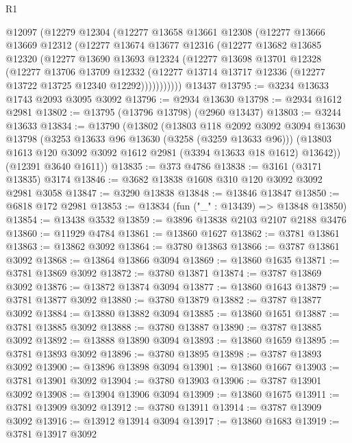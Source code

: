 \begin{lexlean}{R1}
\begin{coremodule}
    @12097
      (@12279
        @12304
        (@12277
          @13658
          @13661
          @12308
          (@12277
            @13666
            @13669
            @12312
            (@12277
              @13674
              @13677
              @12316
              (@12277
                @13682
                @13685
                @12320
                (@12277
                  @13690
                  @13693
                  @12324
                  (@12277
                    @13698
                    @13701
                    @12328
                    (@12277
                      @13706
                      @13709
                      @12332
                      (@12277 @13714 @13717 @12336 (@12277 @13722 @13725 @12340 @12292)))))))))))
    @13437
@13795 := @3234 @13633 @1743 @2093 @3095 @3092
@13796 := @2934 @13630
@13798 := @2934 @1612 @2981
@13802 := @13795 (@13796 @13798) (@2960 @13437)
@13803 := @3244 @13633
@13834 := @13790
    (@13802
      (@13803
        @118
        @2092
        @3092
        @3094
        @13630
        @13798
        (@3253 @13633 @96 @13630 (@3258 (@3259 @13633 @96)))
        (@13803 @1613 @120 @3092 @3092 @1612 @2981 (@3394 @13633 @18 @1612) @13642))
      (@12391 @3640 @1611))
@13835 := @373 @4786
@13838 := @3161 (@3171 @13835) @3174
@13846 := @3682 @13838 @1608 @310 @120 @3092 @3092 @2981 @3058
@13847 := @3290 @13838
@13848 := @13846 @13847
@13850 := @6818 @172 @2981
@13853 := @13834 (fun ("_" : @13439) => @13848 @13850)
@13854 := @13438 @3532
@13859 := @3896 @13838 @2103 @2107 @2188 @3476
@13860 := @11929 @4784
@13861 := @13860 @1627
@13862 := @3781 @13861
@13863 := @13862 @3092
@13864 := @3780 @13863
@13866 := @3787 @13861 @3092
@13868 := @13864 @13866 @3094
@13869 := @13860 @1635
@13871 := @3781 @13869 @3092
@13872 := @3780 @13871
@13874 := @3787 @13869 @3092
@13876 := @13872 @13874 @3094
@13877 := @13860 @1643
@13879 := @3781 @13877 @3092
@13880 := @3780 @13879
@13882 := @3787 @13877 @3092
@13884 := @13880 @13882 @3094
@13885 := @13860 @1651
@13887 := @3781 @13885 @3092
@13888 := @3780 @13887
@13890 := @3787 @13885 @3092
@13892 := @13888 @13890 @3094
@13893 := @13860 @1659
@13895 := @3781 @13893 @3092
@13896 := @3780 @13895
@13898 := @3787 @13893 @3092
@13900 := @13896 @13898 @3094
@13901 := @13860 @1667
@13903 := @3781 @13901 @3092
@13904 := @3780 @13903
@13906 := @3787 @13901 @3092
@13908 := @13904 @13906 @3094
@13909 := @13860 @1675
@13911 := @3781 @13909 @3092
@13912 := @3780 @13911
@13914 := @3787 @13909 @3092
@13916 := @13912 @13914 @3094
@13917 := @13860 @1683
@13919 := @3781 @13917 @3092

\end{coremodule}
\end{lexlean}
